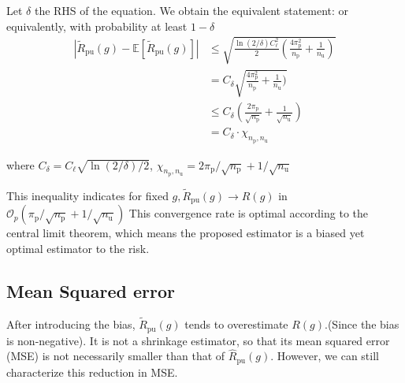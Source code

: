 \documentclass[12pt]{article}
\theoremstyle{definition}
\begin{document}
Let $\delta$ the RHS of the equation. We obtain the equivalent statement:
or equivalently, with probability at least $1-\delta$
\[
\begin{aligned}
\left|\widetilde{R}_{\mathrm{pu}}(g)-\mathbb{E}\left[\widetilde{R}_{\mathrm{pu}}(g)\right]\right| & \leq \sqrt{\frac{\ln (2 / \delta) C_{\ell}^{2}}{2}\left(\frac{4 \pi_{\mathrm{p}}^{2}}{n_{\mathrm{p}}}+\frac{1}{n_{\mathrm{u}}}\right)} \\
& = C_{\delta}\sqrt{\frac{4 \pi_{\mathrm{p}}^{2}}{n_{\mathrm{p}}}+\frac{1}{n_{\mathrm{u}}})}\\
& \leq C_{\delta}\left(\frac{2 \pi_{\mathrm{p}}}{\sqrt{n_{\mathrm{p}}}}+\frac{1}{\sqrt{n_{\mathrm{u}}}}\right) \\
&=C_{\delta} \cdot \chi_{n_{\mathrm{p}}, n_{\mathrm{u}}}
\end{aligned}
\]

where $C_{\delta}=C_{\ell} \sqrt{\ln (2 / \delta) / 2}$, $\chi_{n_{\mathrm{p}}, n_{\mathrm{u}}}=2 \pi_{\mathrm{p}} / \sqrt{n_{\mathrm{p}}}+1 / \sqrt{n_{\mathrm{u}}}$

This inequality indicates for fixed
$g, \widetilde{R}_{\mathrm{pu}}(g) \rightarrow R(g)$ in $\mathcal{O}_{p}\left(\pi_{\mathrm{p}} / \sqrt{n_{\mathrm{p}}}+1 / \sqrt{n_{\mathrm{u}}}\right)$
This convergence rate is optimal according to the central limit theorem, which means the proposed estimator is a biased yet optimal estimator to the risk.

\subsection{Mean Squared error}
After introducing the bias, $\widetilde{R}_{\mathrm{pu}}(g)$ tends to overestimate $R(g) .$(Since the bias is non-negative). It is not a shrinkage estimator, so that its mean squared error (MSE) is not necessarily smaller than that of $\widehat{R}_{\mathrm{pu}}(g)$. However, we can still characterize this reduction in MSE.
\end{document}
